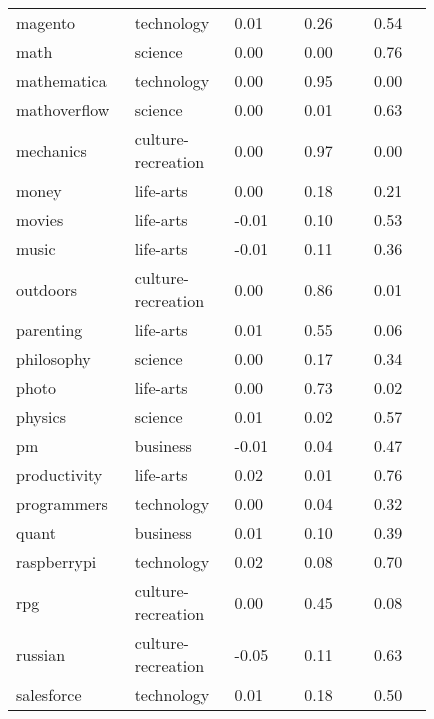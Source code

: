\begin{longtabu}{@{}
	p{0.2\linewidth}
	p{0.2\linewidth}
	P{0.15\linewidth}
	P{0.15\linewidth}
	P{0.13\linewidth}@{}}
magento          & technology         & 0.01        & 0.26          & 0.54           \\
math             & science            & 0.00        & 0.00          & 0.76           \\
mathematica      & technology         & 0.00        & 0.95          & 0.00           \\
mathoverflow     & science            & 0.00        & 0.01          & 0.63           \\
mechanics        & culture-recreation & 0.00        & 0.97          & 0.00           \\
money            & life-arts          & 0.00        & 0.18          & 0.21           \\
movies           & life-arts          & -0.01       & 0.10          & 0.53           \\
music            & life-arts          & -0.01       & 0.11          & 0.36           \\
outdoors         & culture-recreation & 0.00        & 0.86          & 0.01           \\
parenting        & life-arts          & 0.01        & 0.55          & 0.06           \\
philosophy       & science            & 0.00        & 0.17          & 0.34           \\
photo            & life-arts          & 0.00        & 0.73          & 0.02           \\
physics          & science            & 0.01        & 0.02          & 0.57           \\
pm               & business           & -0.01       & 0.04          & 0.47           \\
productivity     & life-arts          & 0.02        & 0.01          & 0.76           \\
programmers      & technology         & 0.00        & 0.04          & 0.32           \\
quant            & business           & 0.01        & 0.10          & 0.39           \\
raspberrypi      & technology         & 0.02        & 0.08          & 0.70           \\
rpg              & culture-recreation & 0.00        & 0.45          & 0.08           \\
russian          & culture-recreation & -0.05       & 0.11          & 0.63           \\
salesforce       & technology         & 0.01        & 0.18          & 0.50           \\

\end{longtabu}
